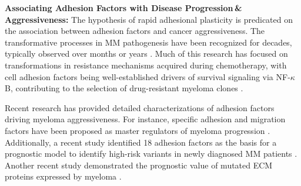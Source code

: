 \textbf{Associating Adhesion Factors with Disease Progression\,\&\,Aggressiveness:}
The hypothesis of rapid adhesional plasticity is predicated on the association
between adhesion factors and cancer aggressiveness. The transformative processes
in MM pathogenesis have been recognized for decades, typically observed over
months or years \cite{hallekMultipleMyelomaIncreasing1998}. Much of this
research has focused on transformations in resistance mechanisms acquired during
chemotherapy, with cell adhesion factors being well-established drivers of
survival signaling via NF-$\kappa$B, contributing to the selection of
drug-resistant myeloma clones \cite{landowskiCellAdhesionmediatedDrug2003,
      solimandoDrugResistanceMultiple2022}.


Recent research has provided detailed characterizations of adhesion factors
driving myeloma aggressiveness. For instance, specific adhesion and migration
factors have been proposed as master regulators of myeloma progression%
\cite{shenProgressionSignatureUnderlies2021}.%
Additionally, a recent study identified 18 adhesion factors as the basis for a
prognostic model to identify high-risk variants in newly diagnosed MM patients
\cite{huDevelopmentCellAdhesionbased2024}. Another recent study demonstrated the
prognostic value of mutated \ac{ECM} proteins expressed by myeloma
\cite{eversPrognosticValueExtracellular2023}.


